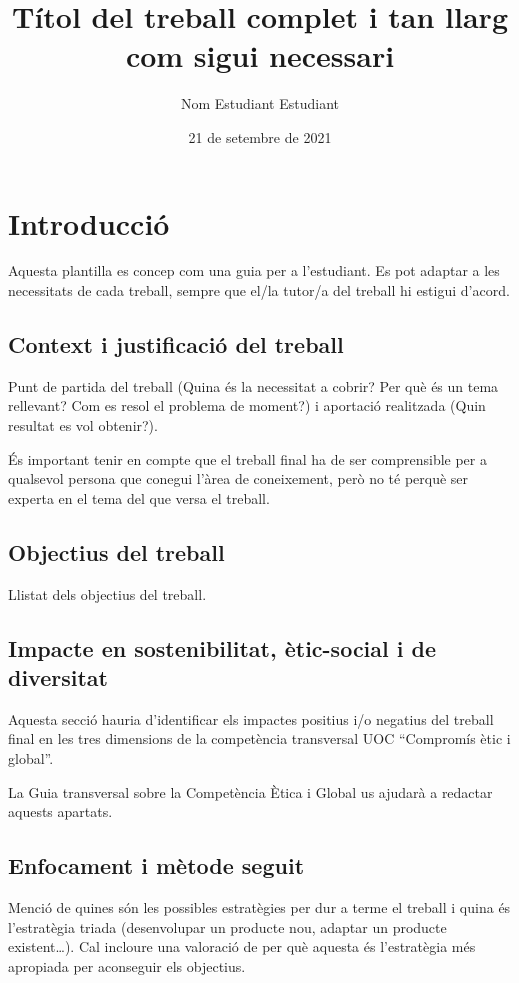 \documentclass[CAT,BIB]{TFUOC}%
\title{Títol del treball complet i tan llarg com sigui necessari}
\author{Nom Estudiant Estudiant}
\date{21 de setembre de 2021}
\begin{document}
\estructura

\tableofcontents

\listoffigures

\listoftables




\chapter{Introducció}

Aquesta plantilla es concep com una guia per a l’estudiant. Es pot adaptar a les necessitats de cada treball, sempre que el/la tutor/a del treball hi estigui d’acord.

\section{Context i justificació del treball}


Punt de partida del treball (Quina és la necessitat a cobrir? Per què és un tema rellevant? Com es resol el problema de moment?) i aportació realitzada (Quin resultat es vol obtenir?).

És important tenir en compte que el treball final ha de ser comprensible per a qualsevol persona que conegui l'àrea de coneixement, però no té perquè ser experta en el tema del que versa el treball.

\section{Objectius del treball}

Llistat dels objectius del treball.

\section{Impacte en sostenibilitat, ètic-social i de diversitat}
\label{s:etic}

Aquesta secció hauria d'identificar els impactes positius i/o negatius del treball final en les tres dimensions de la competència transversal UOC “Compromís ètic i global”.
 
La Guia transversal sobre la Competència Ètica i Global us ajudarà a redactar aquests apartats.


\section{Enfocament i mètode seguit}

Menció de quines són les possibles estratègies per dur a terme el treball i quina és l’estratègia triada (desenvolupar un producte nou, adaptar un producte existent…). Cal incloure una valoració de per què aquesta és l’estratègia més apropiada per aconseguir els objectius.   	
\end{document}
